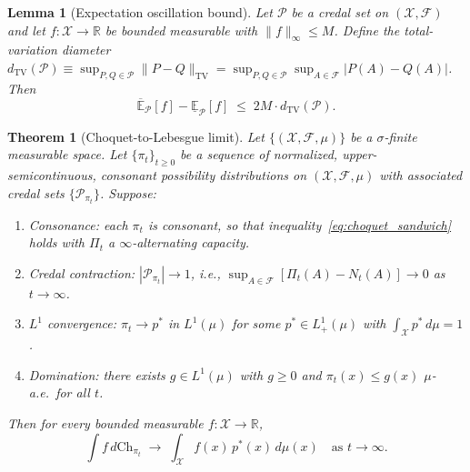 \documentclass[10pt,a4paper]{amsart}
\newtheorem{lemma}{Lemma}
\newtheorem{theorem}{Theorem}
\newcommand{\E}{\mathbb{E}}
\newcommand{\Lone}{L^1}
\newcommand{\R}{\mathbb{R}}
\newcommand{\calF}{\mathcal{F}}
\newcommand{\calX}{\mathcal{X}}
\begin{document}
\begin{lemma}[Expectation oscillation bound]
\label{lem:oscillation}
Let $\mathcal{P}$ be a credal set on $(\calX,\calF)$ and let
$f:\calX\to\R$ be bounded measurable with $\|f\|_\infty\le M$.
Define the total-variation diameter
$d_{\mathrm{TV}}(\mathcal{P}) \equiv \sup_{P,Q\in\mathcal{P}}\|P-Q\|_{\mathrm{TV}}
= \sup_{P,Q\in\mathcal{P}}\sup_{A\in\calF}|P(A)-Q(A)|$.
Then
\begin{equation}
\overline{\E}_\mathcal{P}[f] - \underline{\E}_\mathcal{P}[f]
\;\le\; 2M\cdot d_{\mathrm{TV}}(\mathcal{P}).
\label{eq:oscillation}
\end{equation}
\end{lemma}

\begin{theorem}[Choquet-to-Lebesgue limit]
\label{thm:choquet_lebesgue}
Let $\{(\calX,\calF,\mu)\}$ be a $\sigma$-finite measurable space.
Let $\{\pi_t\}_{t\ge 0}$ be a sequence of normalized, upper-semi\-continuous,
\emph{consonant} possibility distributions on $(\calX,\calF,\mu)$ with
associated credal sets $\{\mathcal{P}_{\pi_t}\}$.
Suppose:
\begin{enumerate}[label=\textup{(A\arabic*)},ref=A\arabic*]
\item\label{A1} \emph{Consonance}: each $\pi_t$ is consonant, so that
  inequality~\eqref{eq:choquet_sandwich} holds with $\Pi_t$ a
  $\infty$-alternating capacity.
\item\label{A2} \emph{Credal contraction}: $|\mathcal{P}_{\pi_t}|\to 1$,
  i.e., $\sup_{A\in\calF}[\Pi_t(A)-N_t(A)]\to 0$ as $t\to\infty$.
\item\label{A3} \emph{$L^1$ convergence}: $\pi_t\to p^*$ in $\Lone(\mu)$ for
  some $p^*\in\Lone_+(\mu)$ with $\int_\calX p^*\,d\mu=1$.
\item\label{A4} \emph{Domination}: there exists $g\in\Lone(\mu)$ with $g\ge 0$
  and $\pi_t(x)\le g(x)$ $\mu$-a.e.\ for all $t$.
\end{enumerate}
Then for every bounded measurable $f:\calX\to\R$,
\begin{equation}
\int f\,d\mathrm{Ch}_{\pi_t}
\;\longrightarrow\;
\int_\calX f(x)\,p^*(x)\,d\mu(x)
\quad\text{as }t\to\infty.
\label{eq:choquet_limit}
\end{equation}
\end{theorem}
\end{document}
